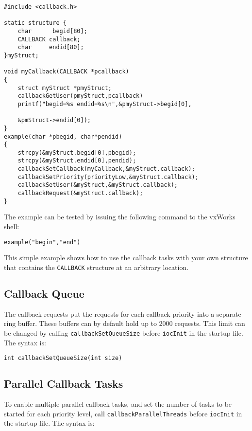 \begin{verbatim}
#include <callback.h>

static structure {
    char      begid[80];
    CALLBACK callback;
    char     endid[80];
}myStruct;

void myCallback(CALLBACK *pcallback)
{
    struct myStruct *pmyStruct;
    callbackGetUser(pmyStruct,pcallback)
    printf("begid=%s endid=%s\n",&pmyStruct->begid[0],

    &pmStruct->endid[0]);
}
example(char *pbegid, char*pendid)
{
    strcpy(&myStruct.begid[0],pbegid);
    strcpy(&myStruct.endid[0],pendid);
    callbackSetCallback(myCallback,&myStruct.callback);
    callbackSetPriority(priorityLow,&myStruct.callback);
    callbackSetUser(&myStruct,&myStruct.callback);
    callbackRequest(&myStruct.callback);
}
\end{verbatim}

The example can be tested by issuing the following command to the vxWorks shell:

\begin{verbatim}
example("begin","end")
\end{verbatim}

This simple example shows how to use the callback tasks with your own structure that contains the \verb|CALLBACK| structure 
at an arbitrary location.

\subsection{Callback Queue}

The callback requests put the requests for each callback priority into a separate ring buffer. These buffers can by default 
hold up to 2000 requests. This limit can be changed by calling \verb|callbackSetQueueSize| before \verb|iocInit| in the 
startup file. The syntax is:

\begin{verbatim}
int callbackSetQueueSize(int size)
\end{verbatim}

\subsection{Parallel Callback Tasks}
\label{Parallel Callback Tasks}

To enable multiple parallel callback tasks, and set the number of tasks to be started for each priority level, call
\verb|callbackParallelThreads| before \verb|iocInit| in the startup file. The syntax is:

